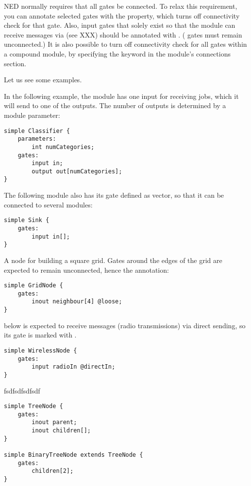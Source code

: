 NED normally requires that all gates be connected. To relax this
requirement, you can annotate selected gates with the 
property, which turns off connectivity check for that gate. Also, input
gates that solely exist so that the module can receive messages via
 (see XXX) should be annotated with .
( gates must remain unconnected.) It is also possible
to turn off connectivity check for all gates within a compound module, by
specifying the  keyword in the module's
connections section.

Let us see some examples.

In the following example, the  module has one input for
receiving jobs, which it will send to one of the outputs. The number of
outputs is determined by a module parameter:

\begin{verbatim}
simple Classifier {
    parameters:
        int numCategories;
    gates:
        input in;
        output out[numCategories];
}
\end{verbatim}

The following  module also has its  gate defined
as vector, so that it can be connected to several modules:

\begin{verbatim}
simple Sink {
    gates:
        input in[];
}
\end{verbatim}

A node for building a square grid. Gates around the edges of the grid are
expected to remain unconnected, hence the  annotation:

\begin{verbatim}
simple GridNode {
    gates:
        inout neighbour[4] @loose;
}
\end{verbatim}

 below is expected to receive messages (radio transmissions)
via direct sending, so its  gate is marked with .

\begin{verbatim}
simple WirelessNode {
    gates:
        input radioIn @directIn;
}
\end{verbatim}

fsdfsdfsdfsdf

\begin{verbatim}
simple TreeNode {
    gates:
        inout parent;
        inout children[];
}

simple BinaryTreeNode extends TreeNode {
    gates:
        children[2];
}
\end{verbatim}

